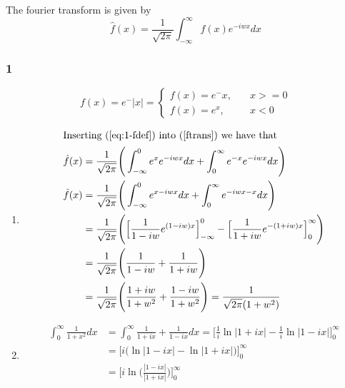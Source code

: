 \documentclass[a4paper]{article}
\newcommand{\ex}[1]{\subsubsection*{#1}}
\begin{document}
\pagestyle{fancy} %



The fourier transform is given by
\[\hat f(x) = \frac{1}{\sqrt{2\pi}}\int_{-\infty}^{\infty}{f(x)e^{-iwx} dx}
    \label{ftrans}\]


\ex{1}
\[ f(x) = e^-|x| = 
    \begin{cases}
        f(x) = e^-x, &\quad x >= 0 \\
        f(x) = e^x, &\quad x < 0 
    \end{cases} \label{eq:1-fdef} \]

\begin{enumerate}[label=\alph*)]
    \item { 
        \begin{align}
            \intertext{Inserting (\ref{eq:1-fdef}) into (\ref{ftrans}) we have that}
            \hat f(x) &= \frac{1}{\sqrt{2\pi}}\Bigg(\int_{-\infty}^0{e^x
                e^{-iwx} dx} + \int_0^{\infty}{e^{-x} e^{-iwx} dx}\Bigg) \\
            \hat f(x) &= \frac{1}{\sqrt{2\pi}}\Bigg(\int_{-\infty}^0{e^{x-iwx}dx} 
                + \int_0^{\infty}{e^{-iwx-x} dx}\Bigg) \\
            &= \frac{1}{\sqrt{2\pi}}\Bigg(\Big[{\frac{1}{1-iw}e^{(1-iw)x}\Big]_
                {-\infty}^{0}} - \Big[{\frac{1}{1+iw}
                e^{-(1+iw)x}\Big]_{0}^{\infty}}\Bigg) \\
            &= \frac{1}{\sqrt{2\pi}}\Bigg(\frac{1}{1-iw} + \frac{1}{1+iw}\Bigg) \\
            &= \frac{1}{\sqrt{2\pi}}\Bigg(\frac{1+iw}{1+w^2} +
                \frac{1-iw}{1+w^2}\Bigg) = \frac{1}{\sqrt{2\pi}(1 + w^2)}\\
        \end{align}
    }

    \item{  %
        \begin{align}
            \int_0^\infty{\frac{1}{1+x^2} dx} &= \int_0^\infty{\frac{1}{1+ix} +
                \frac{1}{1-ix} dx} = \Big[ \frac{1}{i}\ln|1+ix| -
                \frac{1}{i}\ln|1-ix|\Big]_0^\infty\\
            &= \Big[ i\Big(\ln|1-ix| - \ln|1+ix|\Big)\Big]_0^\infty \\
            &= \Big[ i\ln\Big(\frac{|1-ix|}{|1+ix|}\Big)\Big]_0^\infty \\
        \end{align}
    }
\end{enumerate}
\end{document}

